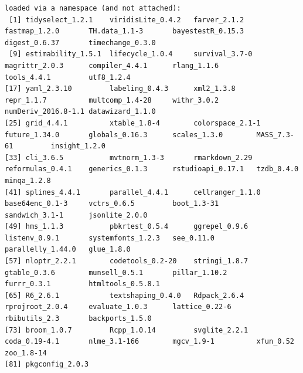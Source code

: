 \documentclass[
  12pt,
]{article}
\begin{document}
\begin{verbatim}
loaded via a namespace (and not attached):
 [1] tidyselect_1.2.1    viridisLite_0.4.2   farver_2.1.2        fastmap_1.2.0       TH.data_1.1-3       bayestestR_0.15.3   digest_0.6.37       timechange_0.3.0   
 [9] estimability_1.5.1  lifecycle_1.0.4     survival_3.7-0      magrittr_2.0.3      compiler_4.4.1      rlang_1.1.6         tools_4.4.1         utf8_1.2.4         
[17] yaml_2.3.10         labeling_0.4.3      xml2_1.3.8          repr_1.1.7          multcomp_1.4-28     withr_3.0.2         numDeriv_2016.8-1.1 datawizard_1.1.0   
[25] grid_4.4.1          xtable_1.8-4        colorspace_2.1-1    future_1.34.0       globals_0.16.3      scales_1.3.0        MASS_7.3-61         insight_1.2.0      
[33] cli_3.6.5           mvtnorm_1.3-3       rmarkdown_2.29      reformulas_0.4.1    generics_0.1.3      rstudioapi_0.17.1   tzdb_0.4.0          minqa_1.2.8        
[41] splines_4.4.1       parallel_4.4.1      cellranger_1.1.0    base64enc_0.1-3     vctrs_0.6.5         boot_1.3-31         sandwich_3.1-1      jsonlite_2.0.0     
[49] hms_1.1.3           pbkrtest_0.5.4      ggrepel_0.9.6       listenv_0.9.1       systemfonts_1.2.3   see_0.11.0          parallelly_1.44.0   glue_1.8.0         
[57] nloptr_2.2.1        codetools_0.2-20    stringi_1.8.7       gtable_0.3.6        munsell_0.5.1       pillar_1.10.2       furrr_0.3.1         htmltools_0.5.8.1  
[65] R6_2.6.1            textshaping_0.4.0   Rdpack_2.6.4        rprojroot_2.0.4     evaluate_1.0.3      lattice_0.22-6      rbibutils_2.3       backports_1.5.0    
[73] broom_1.0.7         Rcpp_1.0.14         svglite_2.2.1       coda_0.19-4.1       nlme_3.1-166        mgcv_1.9-1          xfun_0.52           zoo_1.8-14         
[81] pkgconfig_2.0.3    
\end{verbatim}
\end{document}
